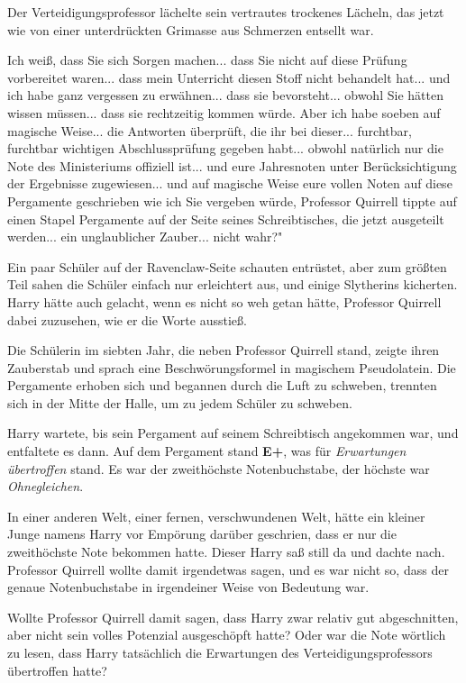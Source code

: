 Der Verteidigungsprofessor lächelte sein vertrautes trockenes Lächeln, das jetzt
wie von einer unterdrückten Grimasse aus Schmerzen entsellt war.

\glqq Ich weiß, dass Sie sich Sorgen machen... dass Sie nicht auf diese Prüfung
vorbereitet waren... dass mein Unterricht diesen Stoff nicht behandelt hat...
und ich habe ganz vergessen zu erwähnen... dass sie bevorsteht... obwohl Sie
hätten wissen müssen... dass sie rechtzeitig kommen würde. Aber ich habe soeben
auf magische Weise... die Antworten überprüft, die ihr bei dieser... furchtbar,
furchtbar wichtigen Abschlussprüfung gegeben habt... obwohl natürlich nur die
Note des Ministeriums offiziell ist... und eure Jahresnoten unter
Berücksichtigung der Ergebnisse zugewiesen... und auf magische Weise eure vollen
Noten auf diese Pergamente geschrieben wie ich Sie vergeben würde\grqq{},
Professor Quirrell tippte auf einen Stapel Pergamente auf der Seite seines
Schreibtisches, \glqq die jetzt ausgeteilt werden... ein unglaublicher Zauber...
nicht wahr?"

Ein paar Schüler auf der Ravenclaw-Seite schauten entrüstet, aber zum größten
Teil sahen die Schüler einfach nur erleichtert aus, und einige Slytherins
kicherten. Harry hätte auch gelacht, wenn es nicht so weh getan hätte, Professor
Quirrell dabei zuzusehen, wie er die Worte ausstieß.

Die Schülerin im siebten Jahr, die neben Professor Quirrell stand, zeigte ihren
Zauberstab und sprach eine Beschwörungsformel in magischem Pseudolatein. Die
Pergamente erhoben sich und begannen durch die Luft zu schweben, trennten sich
in der Mitte der Halle, um zu jedem Schüler zu schweben.

Harry wartete, bis sein Pergament auf seinem Schreibtisch angekommen war, und
entfaltete es dann. Auf dem Pergament stand \textbf{E+}, was für
\emph{Erwartungen übertroffen} stand. Es war der zweithöchste Notenbuchstabe,
der höchste war \emph{Ohnegleichen}.

In einer anderen Welt, einer fernen, verschwundenen Welt, hätte ein kleiner
Junge namens Harry vor Empörung darüber geschrien, dass er nur die zweithöchste
Note bekommen hatte. Dieser Harry saß still da und dachte nach. Professor
Quirrell wollte damit irgendetwas sagen, und es war nicht so, dass der genaue
Notenbuchstabe in irgendeiner Weise von Bedeutung war.

Wollte Professor Quirrell damit sagen, dass Harry zwar relativ gut
abgeschnitten, aber nicht sein volles Potenzial ausgeschöpft hatte? Oder war die
Note wörtlich zu lesen, dass Harry tatsächlich die Erwartungen des
Verteidigungsprofessors übertroffen hatte?

